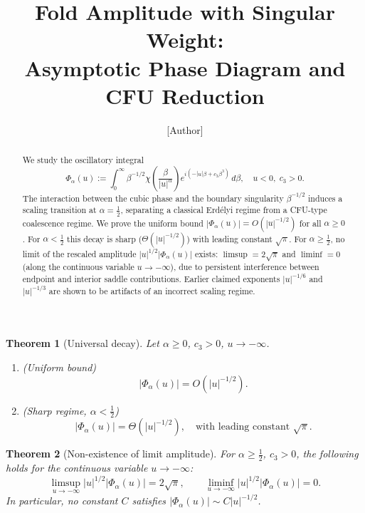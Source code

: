 \documentclass[12pt,a4paper]{amsart}
\newtheorem{theorem}{Theorem}[section]
\theoremstyle{definition}
\begin{document}
\title{Fold Amplitude with Singular Weight:\\
  Asymptotic Phase Diagram and CFU Reduction}

\author{[Author]}

\begin{abstract}
We study the oscillatory integral
\[
  \Phi_\alpha(u)
  :=\int_0^\infty
  \beta^{-1/2}
  \chi\!\left(\frac{\beta}{|u|^\alpha}\right)
  e^{i(-|u|\beta + c_3\beta^3)}\,d\beta,
  \quad u<0,\; c_3>0.
\]
The interaction between the cubic phase and the boundary singularity
$\beta^{-1/2}$ induces a scaling transition at $\alpha=\tfrac{1}{2}$,
separating a classical Erd\'elyi regime from a CFU-type
coalescence regime.
We prove the uniform bound
$|\Phi_\alpha(u)| = O(|u|^{-1/2})$ for all $\alpha\ge 0$.
For $\alpha<\tfrac{1}{2}$ this decay is sharp
($\Theta(|u|^{-1/2})$) with leading constant $\sqrt{\pi}$.
For $\alpha\ge\tfrac{1}{2}$, no limit of the rescaled amplitude
$|u|^{1/2}|\Phi_\alpha(u)|$ exists:
$\limsup=2\sqrt{\pi}$ and $\liminf=0$
(along the continuous variable $u\to-\infty$),
due to persistent interference between
endpoint and interior saddle contributions.
Earlier claimed exponents $|u|^{-1/6}$ and $|u|^{-1/3}$
are shown to be artifacts of an incorrect scaling regime.
\end{abstract}

\maketitle

\begin{theorem}[Universal decay]
\label{thm:decay}
Let $\alpha\ge 0$, $c_3>0$, $u\to-\infty$.
\begin{enumerate}[\rm(i)]
\item \textup{(Uniform bound)}
  \[
    |\Phi_\alpha(u)| = O(|u|^{-1/2}).
  \]
\item \textup{(Sharp regime, $\alpha<\tfrac{1}{2}$)}
  \[
    |\Phi_\alpha(u)| = \Theta(|u|^{-1/2}),
    \quad\text{with leading constant }\sqrt{\pi}.
  \]
\end{enumerate}
\end{theorem}

\begin{theorem}[Non-existence of limit amplitude]
\label{thm:nolimit}
For $\alpha\ge\tfrac{1}{2}$, $c_3>0$,
the following holds for the continuous variable $u\to-\infty$:
\[
  \limsup_{u\to-\infty}|u|^{1/2}|\Phi_\alpha(u)| = 2\sqrt{\pi},
  \qquad
  \liminf_{u\to-\infty}|u|^{1/2}|\Phi_\alpha(u)| = 0.
\]
In particular, no constant $C$ satisfies
$|\Phi_\alpha(u)|\sim C|u|^{-1/2}$.
\end{theorem}
\end{document}
